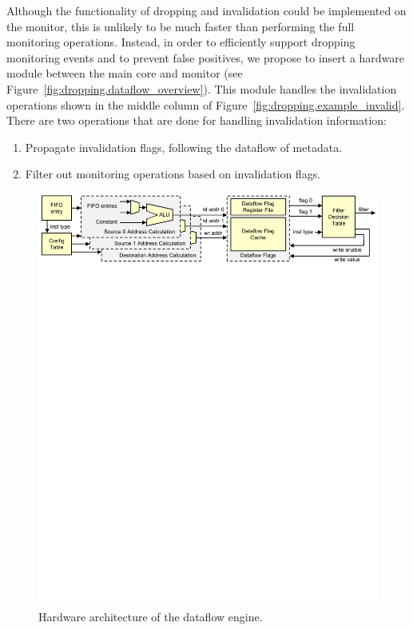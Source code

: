 Although the functionality of dropping and invalidation could be implemented on
the monitor, this is unlikely to be much faster than performing the full monitoring
operations.
Instead, in order to efficiently support dropping monitoring events and to prevent false
positives, we propose to insert a hardware module between the main core and
monitor (see Figure~\ref{fig:dropping.dataflow_overview}). 
This module handles the invalidation operations shown in the middle column of
Figure~\ref{fig:dropping.example_invalid}.
There are two operations that are done for handling invalidation information:

\begin{enumerate}
  \item Propagate invalidation flags, following the dataflow of metadata.
  \item Filter out monitoring operations based on invalidation flags.
\end{enumerate}

\begin{figure}
  \begin{center}
    \includegraphics[]{figs/dataflow_architecture.pdf}
    \vspace{-0.1in}
    \caption{Hardware architecture of the dataflow engine.}
    \label{fig:dropping.dataflow} 
    \vspace{-0.1in}
  \end{center}
\end{figure}

